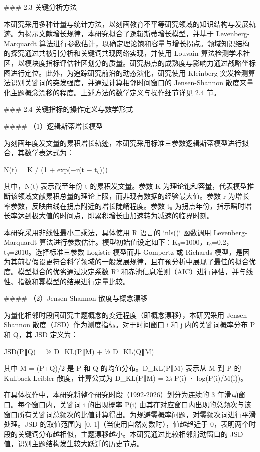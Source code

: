 \documentclass[12pt,a4paper]{article}
\begin{document}
\#\#\# 2.3 关键分析方法

本研究采用多种计量与统计方法，以刻画教育不平等研究领域的知识结构与发展轨迹。为揭示文献增长规律，本研究拟合了逻辑斯蒂增长模型，并基于 Levenberg-Marquardt 算法进行参数估计，以确定理论饱和容量与增长拐点。领域知识结构的探究通过共被引分析和关键词共现网络实现，并使用 Louvain 算法检测学术社区，以模块度指标评估社区划分的质量。研究热点的成熟度与影响力通过战略坐标图进行定位。此外，为追踪研究前沿的动态演化，研究使用 Kleinberg 突发检测算法识别关键词的突发强度，并通过计算相邻时间窗口的 Jensen-Shannon 散度来量化主题概念漂移的程度。上述方法的数学定义与操作细节详见 2.4 节。

\#\#\# 2.4 关键指标的操作定义与数学形式

\#\#\#\# （1）逻辑斯蒂增长模型

为刻画年度发文量的累积增长轨迹，本研究采用标准三参数逻辑斯蒂模型进行拟合，其数学表达式为：

N(t) = K / (1 + exp(−r(t − t₀)))

其中，N(t) 表示截至年份 t 的累积发文量。参数 K 为理论饱和容量，代表模型推断该领域文献累积总量的理论上限，而非现有数据的经验最大值。参数 r 为增长率参数，反映曲线在拐点附近的增长陡峭程度。参数 t₀ 为拐点年份，指示瞬时增长率达到极大值的时间点，即累积增长由加速转为减速的临界时刻。

本研究采用非线性最小二乘法，具体使用 R 语言的 `nls()` 函数调用 Levenberg-Marquardt 算法进行参数估计。模型初始值设定如下：K₀=1000，r₀=0.2，t₀=2010。选择标准三参数 Logistic 模型而非 Gompertz 或 Richards 模型，是因为其前提假设更符合科学领域的一般发展规律，且在预分析中展现了最佳的拟合优度。模型拟合的优劣通过决定系数 R² 和赤池信息准则（AIC）进行评估，并与线性、指数和幂模型的结果进行定量比较。

\#\#\#\# （2）Jensen-Shannon 散度与概念漂移

为量化相邻时段间研究主题概念的变迁程度（即概念漂移），本研究采用 Jensen-Shannon 散度（JSD）作为测度指标。对于时间窗口 i 和 j 内的关键词概率分布 P 和 Q，其 JSD 定义为：

JSD(P∥Q) = ½ D\_KL(P∥M) + ½ D\_KL(Q∥M)

其中 M = (P+Q)/2 是 P 和 Q 的均值分布。D\_KL(P∥M) 表示从 M 到 P 的 Kullback-Leibler 散度，计算公式为 D\_KL(P∥M) = Σᵢ P(i) · log(P(i)/M(i))。

在具体操作中，本研究将整个研究时段（1992-2026）划分为连续的 3 年滑动窗口。每个窗口内，关键词 i 的出现概率 P(i) 由其在对应窗口内出现的总频次与该窗口所有关键词总频次的比值计算得出。为规避零概率问题，对零频次词进行平滑处理。JSD 的取值范围为 [0, 1]（当使用自然对数时），值越趋近于 0，表明两个时段的关键词分布越相似，主题漂移越小。本研究通过比较相邻滑动窗口的 JSD 值，识别主题结构发生较大跃迁的历史节点。
\end{document}
